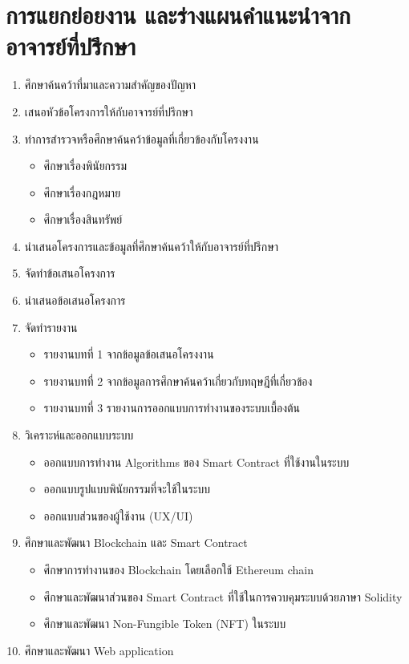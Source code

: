 \documentclass[12pt,oneside,openright,a4paper]{cpe-thai-project}
\begin{document}
\section{การแยกย่อยงาน และร่างแผนคำแนะนำจากอาจารย์ที่ปรึกษา}
\begin{enumerate}
\item ศึกษาค้นคว้าที่มาและความสำคัญของปัญหา
\item เสนอหัวข้อโครงการให้กับอาจารย์ที่ปรึกษา
\item ทำการสำรวจหรือศึกษาค้นคว้าข้อมูลที่เกี่ยวข้องกับโครงงาน
	\begin{itemize}
		\item ศึกษาเรื่องพินัยกรรม
		\item ศึกษาเรื่องกฎหมาย
		\item ศึกษาเรื่องสินทรัพย์
	\end{itemize}
\item นำเสนอโครงการและข้อมูลทึ่ศึกษาค้นคว้าให้กับอาจารย์ที่ปรึกษา
\item จัดทำข้อเสนอโครงการ
\item นำเสนอข้อเสนอโครงการ
\item จัดทำรายงาน
	\begin{itemize}
		\item รายงานบทที่ 1 จากข้อมูลข้อเสนอโครงงาน
		\item รายงานบทที่ 2 จากข้อมูลการศึกษาค้นคว้าเกี่ยวกับทฤษฎีที่เกี่ยวข้อง
		\item รายงานบทที่ 3 รายงานการออกแบบการทำงานของระบบเบื้องต้น
	\end{itemize}
\item วิเคราะห์และออกแบบระบบ
	\begin{itemize}
		\item ออกแบบการทำงาน Algorithms ของ Smart Contract ที่ใช้งานในระบบ
		\item ออกแบบรูปแบบพินัยกรรมที่จะใช้ในระบบ
		\item ออกแบบส่วนของผู้ใช้งาน (UX/UI)
	\end{itemize}
\item ศึกษาและพัฒนา Blockchain และ Smart Contract
	\begin{itemize}
		\item ศึกษาการทำงานของ Blockchain โดยเลือกใช้ Ethereum chain
		\item ศึกษาและพัฒนาส่วนของ Smart Contract ที่ใช้ในการควบคุมระบบด้วยภาษา Solidity
		\item ศึกษาและพัฒนา Non-Fungible Token (NFT) ในระบบ
	\end{itemize}
\item ศึกษาและพัฒนา Web application

\end{enumerate}
\end{document}
